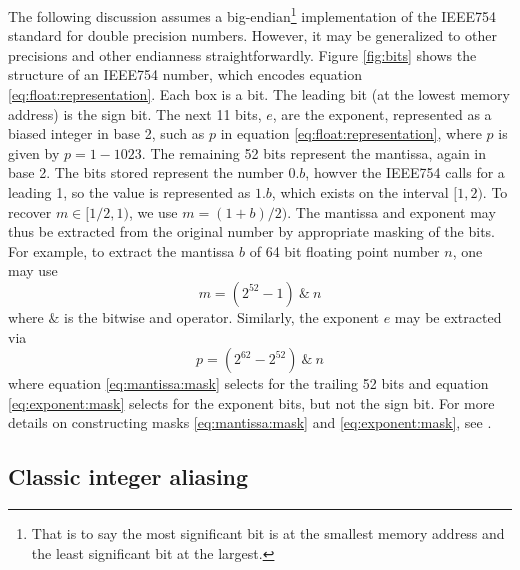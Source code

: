 \documentclass[linenumbers,twocolumn]{aastex631}
\begin{document}
The following discussion assumes a big-endian\footnote{That is to say the most significant bit is at the smallest memory address and the least significant bit at the largest.} implementation of the IEEE754 standard \citep{IEEE754-2019} for double precision numbers. However, it may be generalized to other precisions and other endianness straightforwardly.
Figure \ref{fig:bits} shows the structure of an IEEE754 number, which encodes equation \eqref{eq:float:representation}. Each box is a bit. The leading bit (at the lowest memory address) is the sign bit. The next 11 bits, $e$, are the exponent, represented as a biased integer in base 2, such as $p$ in equation \eqref{eq:float:representation}, where $p$ is given by $p=1-1023$. The remaining 52 bits represent the mantissa, again in base 2. The bits stored represent the number $0.b$, howver the IEEE754 calls for a leading 1, so the value is represented as $1.b$, which exists on the interval $[1,2)$. To recover $m\in [1/2, 1)$, we use $m=(1+b)/2)$. The mantissa and exponent may thus be extracted from the original number by appropriate masking of the bits. For example, to extract the mantissa $b$ of 64 bit floating point number $n$, one may use 
\begin{equation}
    \label{eq:mantissa:mask}
    m = (2^{52} - 1)\ \&\ n
\end{equation}
where $\&$ is the bitwise and operator. Similarly, the exponent $e$ may be extracted via
\begin{equation}
    \label{eq:exponent:mask}
    p = (2^{62} - 2^{52})\ \&\ n
\end{equation}
where equation \eqref{eq:mantissa:mask} selects for the trailing 52 bits and equation \eqref{eq:exponent:mask} selects for the exponent bits, but not the sign bit. For more details on constructing masks \eqref{eq:mantissa:mask} and \eqref{eq:exponent:mask}, see \citet{warren2012hacker}.

\subsection{Classic integer aliasing}
\label{sec:bithack:classic}
\end{document}
